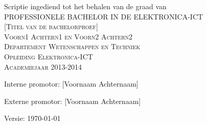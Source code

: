 
%
% 
\AddToShipoutPicture*{\BackgroundPic}
\AddToShipoutPicture*{\BackgroundPicAP}

\newpage


\begin{titlepage}
 \begin{center}
\large Scriptie ingediend tot het behalen van de graad van \\[0.3cm]
\textsc{PROFESSIONELE BACHELOR IN DE ELEKTRONICA-ICT}\\[3.3cm]
\textsc{\LARGE [Titel van de bachelorproef]}\\[0.3cm]
\textsc{\large Voorn1 Achtern1 en Voorn2 Achtern2}\\[0.3cm]
\textsc{\large Departement Wetenschappen en Techniek}\\[0.3cm]
\textsc{\large Opleiding Elektronica-ICT}\\[0.3cm]
\textsc{\large Academiejaar 2013-2014}\\[6.5cm]
 

\begin{minipage}{0.6\textwidth}
\begin{center} \large
Interne promotor: [Voornaam Achternaam]

Externe promotor: [Voornaam Achternaam]
\end{center}
\end{minipage}

 
\vfill
 
{\large Versie: \today}
 
\end{center}
 
\end{titlepage}
% 
% 
% 
% 
% 
% 
% 
% 
